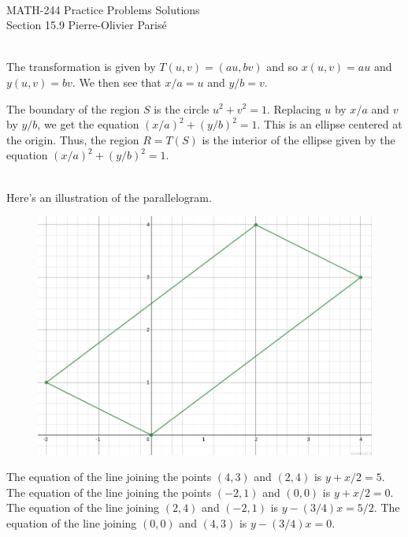 


	\noindent \hrulefill \\
	MATH-244 \semester \hfill Practice Problems Solutions\\
	Section 15.9 \hfill Pierre-Olivier Paris{\'e} \\\vspace*{-1cm}
	
	\noindent\hrulefill
	
	\spc	

	\\
	The transformation is given by $T(u, v) = (au, bv)$ and so $x(u, v) = au$ and $y(u, v) = bv$. We then see that $x/a = u$ and $y/b = v$. 
	
	The boundary of the region $S$ is the circle $u^2 + v^2 = 1$. Replacing $u$ by $x/a$ and $v$ by $y/b$, we get the equation $(x/a)^2 + (y/b)^2 = 1$. This is an ellipse centered at the origin. Thus, the region $R = T(S)$ is the interior of the ellipse given by the equation $(x/a)^2 + (y/b)^2 = 1$.
	
	\spc 
	
	\\
	Here's an illustration of the parallelogram.
		\begin{figure}[h]
		\centering
		\includegraphics[scale=0.4]{prob12_15-9.png}
		\end{figure}
	
	The equation of the line joining the points $(4, 3)$ and $(2, 4)$ is $y + x/2 = 5$. The equation of the line joining the points $(-2, 1)$ and $(0, 0)$ is $y + x/2 = 0$. The equation of the line joining $(2, 4)$ and $(-2, 1)$ is $y - (3/4)x = 5/2$. The equation of the line joining $(0,0)$ and $(4, 3)$ is $y - (3/4)x = 0$.
	

